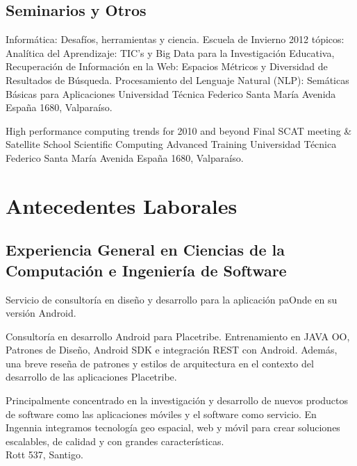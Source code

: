 \documentclass[11pt,letterpaper,roman]{moderncv}
\begin{document}
\subsection{Seminarios y Otros}

 {Informática: Desafíos, herramientas y ciencia.}
{Escuela de Invierno 2012} {tópicos: Analítica del Aprendizaje: TIC's y Big Data
para la Investigación Educativa, Recuperación de Información en la Web: Espacios
Métricos y Diversidad de Resultados de Búsqueda. Procesamiento del Lenguaje
Natural (NLP): Semáticas Básicas para Aplicaciones} {Universidad T\'ecnica
Federico Santa Mar\'ia} {Avenida España 1680, Valpara\'iso.}
	
	
 {High performance computing trends for 2010 and beyond}
{Final SCAT meeting \& Satellite School} {Scientific Computing Advanced
Training} {Universidad T\'ecnica Federico Santa Mar\'ia} {Avenida España 1680,
Valpara\'iso.}


\section{Antecedentes Laborales}

\subsection{Experiencia General en Ciencias de la Computación e Ingeniería de
Software}

 {\scd} {\paonde} {\stgo} {}
{Servicio de consultoría en diseño y desarrollo para la aplicación paOnde en
su versión Android.}

 {\tchr} {\placetribe} {\stgo} {}
{Consultoría en desarrollo Android para Placetribe. Entrenamiento en JAVA OO,
Patrones de Diseño, Android SDK e integración REST con Android. Además, una
breve reseña de patrones y estilos de arquitectura en el contexto del desarrollo
de las aplicaciones Placetribe.}


 {\cf} {\ingennia} {\stgo} {}
{Principalmente concentrado en la investigación y desarrollo de nuevos productos
de software como las aplicaciones móviles y el software como servicio. En
Ingennia integramos tecnología geo espacial, web y móvil para crear soluciones
escalables, de calidad y con grandes características. \\ Rott 537, Santigo.}
\end{document}
